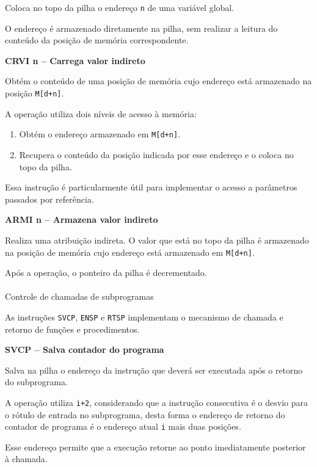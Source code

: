 \documentclass[
  brazilian,
  letterpaper,
]{book}
\makeatletter
\let\oldparagraph\paragraph
\renewcommand{\paragraph}{
    \@ifstar
      \xxxParagraphStar
      \xxxParagraphNoStar
  }
\newcommand{\xxxParagraphStar}[1]{\oldparagraph*{#1}\mbox{}}
\newcommand{\xxxParagraphNoStar}[1]{\oldparagraph{#1}\mbox{}}
\providecommand{\tightlist}{%
  \setlength{\itemsep}{0pt}\setlength{\parskip}{0pt}}
\theoremstyle{plain}
\theoremstyle{definition}
\theoremstyle{remark}
\makeatother
\begin{document}
Coloca no topo da pilha o endereço \texttt{n} de uma variável global.

O endereço é armazenado diretamente na pilha, sem realizar a leitura do
conteúdo da posição de memória correspondente.

\textbf{CRVI n -- Carrega valor indireto}

Obtém o conteúdo de uma posição de memória cujo endereço está armazenado
na posição \texttt{M{[}d+n{]}}.

A operação utiliza dois níveis de acesso à memória:

\begin{enumerate}
\def\labelenumi{\arabic{enumi}.}
\tightlist
\item
  Obtém o endereço armazenado em \texttt{M{[}d+n{]}}.
\item
  Recupera o conteúdo da posição indicada por esse endereço e o coloca
  no topo da pilha.
\end{enumerate}

Essa instrução é particularmente útil para implementar o acesso a
parâmetros passados por referência.

\textbf{ARMI n -- Armazena valor indireto}

Realiza uma atribuição indireta. O valor que está no topo da pilha é
armazenado na posição de memória cujo endereço está armazenado em
\texttt{M{[}d+n{]}}.

Após a operação, o ponteiro da pilha é decrementado.

\paragraph{Controle de chamadas de
subprogramas}\label{controle-de-chamadas-de-subprogramas}

As instruções \texttt{SVCP}, \texttt{ENSP} e \texttt{RTSP} implementam o
mecanismo de chamada e retorno de funções e procedimentos.

\textbf{SVCP -- Salva contador do programa}

Salva na pilha o endereço da instrução que deverá ser executada após o
retorno do subprograma.

A operação utiliza \texttt{i+2}, considerando que a instrução
consecutiva é o desvio para o rótulo de entrada no subprograma, desta
forma o endereço de retorno do contador de programa é o endereço atual
\texttt{i} mais duas posições.

Esse endereço permite que a execução retorne ao ponto imediatamente
posterior à chamada.
\end{document}

